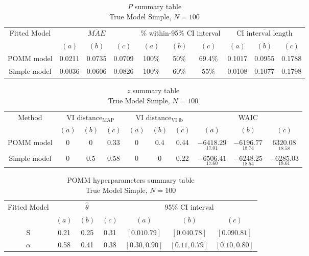 \documentclass[11pt]{amsart}
\begin{document}
\begin{table}[htbp]
\centering
\caption*{
{\large $P$ summary table} \\ 
{\small True Model Simple, $N=100$}
} 
\begin{tabular}{cccccccccc}
\toprule
\multirow{2}{*}{Fitted Model} & \multicolumn{3}{c}{
$\overline{MAE}$ } & \multicolumn{3}{c}{
$\%$ within-95\% CI interval} & \multicolumn{3}{c}{ $\overline{\text{CI interval length}}$} \\
\cmidrule(lr){2-4} \cmidrule(lr){5-7} \cmidrule(lr){8-10}
& $(a)$ & $(b)$ & $(c)$ & $(a)$ & $(b)$ & $(c)$ & $(a)$ & $(b)$ & $(c)$ \\
\midrule
POMM model  &0.0211&  0.0735 & 0.0709 & 100$\%$  & 50$\%$   & 69.4$\%$  & 0.1017 & 0.0955 & 0.1788 \\
Simple model & 0.0036 &  0.0606 & 0.0826 & 100$\%$ &60$\%$  & 55$\%$  & 0.0108 & 0.1077 & 0.1798 \\
\bottomrule
\end{tabular}
\label{table:simulations_from_simple}
\end{table}


\begin{table}[htbp]
\centering
\caption*{
{\large $z$ summary table} \\ 
{\small True Model Simple, $N=100$}
} 
\begin{tabular}{cccccccccc}
\toprule
\multirow{2}{*}{Method} & \multicolumn{3}{c}{
VI $\text{distance}_{\text{MAP}}$} & \multicolumn{3}{c}{
VI $\text{distance}_{\text{VI lb}}$} & \multicolumn{3}{c}{WAIC} \\
\cmidrule(lr){2-4} \cmidrule(lr){5-7} \cmidrule(lr){8-10}
& $(a)$ & $(b)$ & $(c)$ & $(a)$ & $(b)$ & $(c)$ & $(a)$ & $(b)$ & $(c)$ \\
\midrule
POMM model  &0&  0 & 0.33 & 0 & 0.4  & 0.44 & $\underset{17.01}{-6418.29}$ & $\underset{18.74}{-6196.77}$ & $\underset{18.58}{6320.08}$  \\
Simple model & 0 &  0.5 & 0.58 & 0&0 &0.22 & $\underset{17.60}{-6506.41}$ & $\underset{18.54}{-6248.25}$ & $\underset{18.61}{-6285.03}$ \\
\bottomrule
\end{tabular}
\label{table:simulations_from_simple}
\end{table}


\begin{table}[htbp]
\centering
\caption*{
{\large POMM hyperparameters summary table} \\ 
{\small True Model Simple, $N=100$}
} 
\begin{tabular}{ccccccc}
\toprule
\multirow{2}{*}{Fitted Model} & \multicolumn{3}{c}{
$\hat{\theta}$} & \multicolumn{3}{c}{
95$\%$ CI interval} \\
\cmidrule(lr){2-4} \cmidrule(lr){5-7} 
& $(a)$ & $(b)$ & $(c)$ & $(a)$ & $(b)$ & $(c)$  \\
\midrule
S  &0.21 & 0.25 & 0.31 & $[0.01	0.79]$ & $[0.04	0.78]$ & $[0.09	0.81]$   \\
$\alpha$ & 0.58 & 0.41 & 0.38 & $[0.30,0.90]$ & $[0.11,	0.79]$ & $[0.10,	0.80]$  \\
\bottomrule
\end{tabular}
\label{table:simulations_from_simple}
\end{table}
\end{document}
